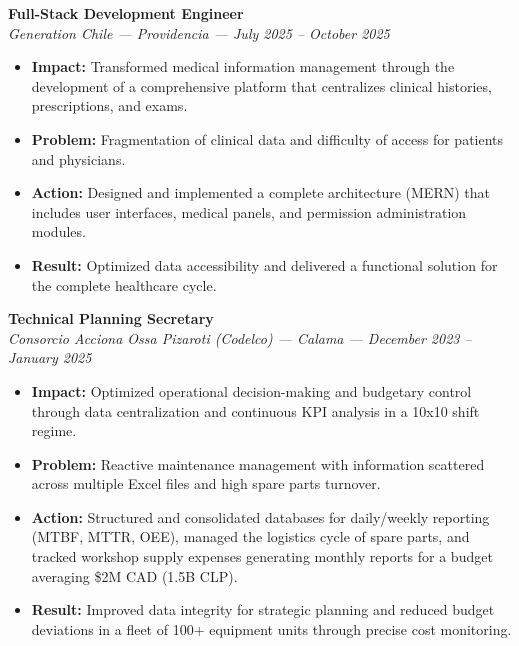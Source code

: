\documentclass[10pt,letterpaper]{article}
\begin{document}
\noindent \textbf{Full-Stack Development Engineer} \\
\textit{Generation Chile — Providencia — July 2025 – October 2025}
\begin{itemize}
    \item \textbf{Impact:} Transformed medical information management through the development of a comprehensive platform that centralizes clinical histories, prescriptions, and exams.
    \item \textbf{Problem:} Fragmentation of clinical data and difficulty of access for patients and physicians.
    \item \textbf{Action:} Designed and implemented a complete architecture (MERN) that includes user interfaces, medical panels, and permission administration modules.
    \item \textbf{Result:} Optimized data accessibility and delivered a functional solution for the complete healthcare cycle.
\end{itemize}

\vspace{0.2cm}

\noindent \textbf{Technical Planning Secretary} \\
\textit{Consorcio Acciona Ossa Pizaroti (Codelco) — Calama — December 2023 – January 2025}
\begin{itemize}
    \item \textbf{Impact:} Optimized operational decision-making and budgetary control through data centralization and continuous KPI analysis in a 10x10 shift regime.
    \item \textbf{Problem:} Reactive maintenance management with information scattered across multiple Excel files and high spare parts turnover.
    \item \textbf{Action:} Structured and consolidated databases for daily/weekly reporting (MTBF, MTTR, OEE), managed the logistics cycle of spare parts, and tracked workshop supply expenses generating monthly reports for a budget averaging \$2M CAD (1.5B CLP).
    \item \textbf{Result:} Improved data integrity for strategic planning and reduced budget deviations in a fleet of 100+ equipment units through precise cost monitoring.
\end{itemize}

\vspace{0.2cm}
\end{document}
